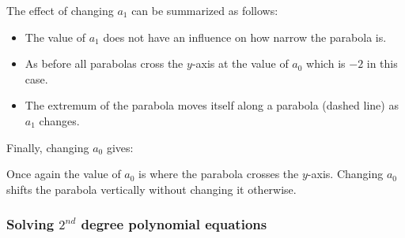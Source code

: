 \noindent The effect of changing $a_1$ can be summarized as follows:
\begin{itemize}
\item The value of $a_1$ does not have an influence on how narrow the parabola is.
\item As before all parabolas cross the $y$-axis at the value of $a_0$ which is $-2$ in this case.
\item The extremum of the parabola moves itself along a parabola (dashed line) as $a_1$ changes.
\end{itemize}
\noindent Finally, changing $a_0$ gives:
\begin{center}
\end{center}
\noindent Once again the value of $a_0$ is where the parabola crosses the $y$-axis. Changing $a_0$ shifts the parabola vertically without changing it otherwise.

\subsubsection{Solving $2^{nd}$ degree polynomial equations}

